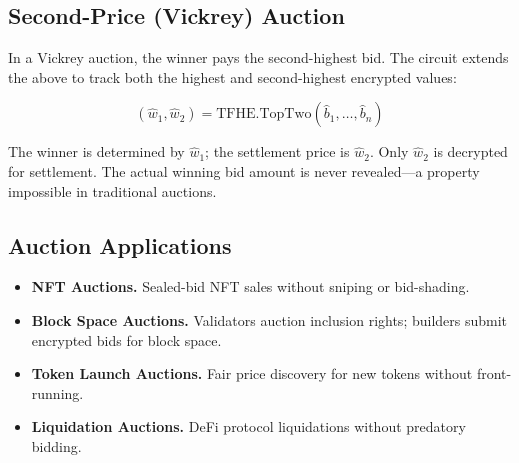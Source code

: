\subsection{Second-Price (Vickrey) Auction}

In a Vickrey auction, the winner pays the second-highest bid. The circuit extends the above to track both the highest and second-highest encrypted values:

\begin{equation}
(\hat{w}_1, \hat{w}_2) = \text{TFHE.TopTwo}(\hat{b}_1, \ldots, \hat{b}_n)
\end{equation}

The winner is determined by $\hat{w}_1$; the settlement price is $\hat{w}_2$. Only $\hat{w}_2$ is decrypted for settlement. The actual winning bid amount is never revealed---a property impossible in traditional auctions.

\subsection{Auction Applications}

\begin{itemize}
    \item \textbf{NFT Auctions.} Sealed-bid NFT sales without sniping or bid-shading.
    \item \textbf{Block Space Auctions.} Validators auction inclusion rights; builders submit encrypted bids for block space.
    \item \textbf{Token Launch Auctions.} Fair price discovery for new tokens without front-running.
    \item \textbf{Liquidation Auctions.} DeFi protocol liquidations without predatory bidding.
\end{itemize}

